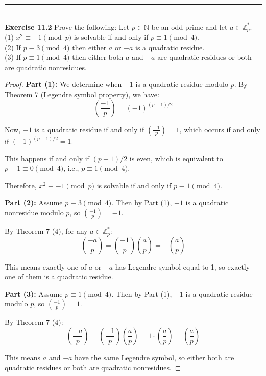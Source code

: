\documentclass[a4paper]{article}
\begin{document}
\noindent\rule{12cm}{0.4pt}\\
\noindent \textbf{Exercise 11.2} Prove the following: Let $p \in \mathbb{N}$ be an odd prime and let $a \in \mathbb{Z}^{*}_{p}$.\\
(1) $ x^{2} \equiv -1 \pmod{p}$ is solvable if and only if $p \equiv 1 \pmod{4}$.\\
(2) If $p \equiv 3 \pmod{4}$ then either $a$ or $-a$ is a quadratic residue.\\
(3) If $p \equiv 1 \pmod{4}$ then either both $a$ and $-a$ are quadratic residues or both are quadratic nonresidues.
\begin{proof}
\textbf{Part (1):} We determine when $-1$ is a quadratic residue modulo $p$. By Theorem 7 (Legendre symbol property), we have:
$$\left(\frac{-1}{p}\right) = (-1)^{(p-1)/2}$$

Now, $-1$ is a quadratic residue if and only if $\left(\frac{-1}{p}\right) = 1$, which occurs if and only if $(-1)^{(p-1)/2} = 1$.

This happens if and only if $(p-1)/2$ is even, which is equivalent to $p - 1 \equiv 0 \pmod{4}$, i.e., $p \equiv 1 \pmod{4}$.

Therefore, $x^2 \equiv -1 \pmod{p}$ is solvable if and only if $p \equiv 1 \pmod{4}$.

\textbf{Part (2):} Assume $p \equiv 3 \pmod{4}$. Then by Part (1), $-1$ is a quadratic nonresidue modulo $p$, so $\left(\frac{-1}{p}\right) = -1$.

By Theorem 7 (4), for any $a \in \mathbb{Z}_p^*$:
$$\left(\frac{-a}{p}\right) = \left(\frac{-1}{p}\right) \left(\frac{a}{p}\right) = -\left(\frac{a}{p}\right)$$

This means exactly one of $a$ or $-a$ has Legendre symbol equal to 1, so exactly one of them is a quadratic residue.

\textbf{Part (3):} Assume $p \equiv 1 \pmod{4}$. Then by Part (1), $-1$ is a quadratic residue modulo $p$, so $\left(\frac{-1}{p}\right) = 1$.

By Theorem 7 (4):
$$\left(\frac{-a}{p}\right) = \left(\frac{-1}{p}\right) \left(\frac{a}{p}\right) = 1 \cdot \left(\frac{a}{p}\right) = \left(\frac{a}{p}\right)$$

This means $a$ and $-a$ have the same Legendre symbol, so either both are quadratic residues or both are quadratic nonresidues.
\end{proof}
\end{document}
